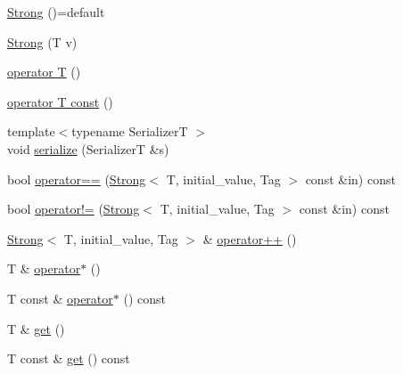 \begin{DoxyCompactItemize}
\item 
\hyperlink{structvt_1_1collective_1_1reduce_1_1detail_1_1_strong_af1121c0e63f347e779f1cad333792056}{Strong} ()=default
\item 
\hyperlink{structvt_1_1collective_1_1reduce_1_1detail_1_1_strong_ad7d4a59581e1961b643c853c8e7c58c3}{Strong} (T v)
\item 
\hyperlink{structvt_1_1collective_1_1reduce_1_1detail_1_1_strong_a6390ad9dc68266d649493d5bcf83dc42}{operator T} ()
\item 
\hyperlink{structvt_1_1collective_1_1reduce_1_1detail_1_1_strong_a641850befb357381a38c66486a27f14f}{operator T const} ()
\item 
{\footnotesize template$<$typename SerializerT $>$ }\\void \hyperlink{structvt_1_1collective_1_1reduce_1_1detail_1_1_strong_a6abf31948f9dbd77f4caeb265fd68586}{serialize} (SerializerT \&s)
\item 
bool \hyperlink{structvt_1_1collective_1_1reduce_1_1detail_1_1_strong_ac8773530a7b4b1a3b5e54eb6f945c582}{operator==} (\hyperlink{structvt_1_1collective_1_1reduce_1_1detail_1_1_strong}{Strong}$<$ T, initial\+\_\+value, Tag $>$ const \&in) const
\item 
bool \hyperlink{structvt_1_1collective_1_1reduce_1_1detail_1_1_strong_a82bf11914af5ac09c78eb102fb04607a}{operator!=} (\hyperlink{structvt_1_1collective_1_1reduce_1_1detail_1_1_strong}{Strong}$<$ T, initial\+\_\+value, Tag $>$ const \&in) const
\item 
\hyperlink{structvt_1_1collective_1_1reduce_1_1detail_1_1_strong}{Strong}$<$ T, initial\+\_\+value, Tag $>$ \& \hyperlink{structvt_1_1collective_1_1reduce_1_1detail_1_1_strong_a403ac1145637bfab0550181b5f7bdd5f}{operator++} ()
\item 
T \& \hyperlink{structvt_1_1collective_1_1reduce_1_1detail_1_1_strong_ae4f668ef8de598177396f4dc575fce3c}{operator$\ast$} ()
\item 
T const  \& \hyperlink{structvt_1_1collective_1_1reduce_1_1detail_1_1_strong_abddd678b81243106268873116676f135}{operator$\ast$} () const
\item 
T \& \hyperlink{structvt_1_1collective_1_1reduce_1_1detail_1_1_strong_a410692a65741df1c5e3a5498f22717c6}{get} ()
\item 
T const  \& \hyperlink{structvt_1_1collective_1_1reduce_1_1detail_1_1_strong_a329a5157d759c1c413380b495d23c79f}{get} () const
\end{DoxyCompactItemize}

